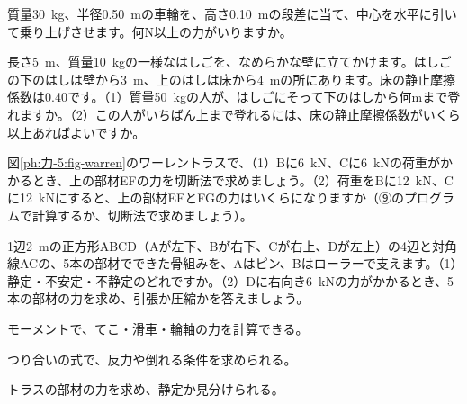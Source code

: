 \bkproblem 質量\qty{30}{kg}、半径\qty{0.50}{m}の車輪を、高さ\qty{0.10}{m}の段差に当て、中心を水平に引いて乗り上げさせます。何N以上の力がいりますか。


\bkproblem 長さ\qty{5}{m}、質量\qty{10}{kg}の一様なはしごを、なめらかな壁に立てかけます。はしごの下のはしは壁から\qty{3}{m}、上のはしは床から\qty{4}{m}の所にあります。床の静止摩擦係数は0.40です。（1）質量\qty{50}{kg}の人が、はしごにそって下のはしから何mまで登れますか。（2）この人がいちばん上まで登れるには、床の静止摩擦係数がいくら以上あればよいですか。

\bkproblem 図\ref{ph:力-5:fig-warren}のワーレントラスで、（1）Bに\qty{6}{kN}、Cに\qty{6}{kN}の荷重がかかるとき、上の部材EFの力を切断法で求めましょう。（2）荷重をBに\qty{12}{kN}、Cに\qty{12}{kN}にすると、上の部材EFとFGの力はいくらになりますか（⑨のプログラムで計算するか、切断法で求めましょう）。

\bkproblem 1辺\qty{2}{m}の正方形ABCD（Aが左下、Bが右下、Cが右上、Dが左上）の4辺と対角線ACの、5本の部材でできた骨組みを、Aはピン、Bはローラーで支えます。（1）静定・不安定・不静定のどれですか。（2）Dに右向き\qty{6}{kN}の力がかかるとき、5本の部材の力を求め、引張か圧縮かを答えましょう。

\begin{furikaeri}
\begin{checklist}
\item モーメントで、てこ・滑車・輪軸の力を計算できる。
\item つり合いの式で、反力や倒れる条件を求められる。
\item トラスの部材の力を求め、静定か見分けられる。
\end{checklist}
\end{furikaeri}
